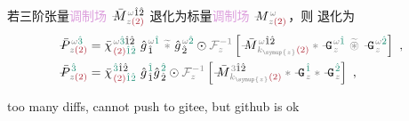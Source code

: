 若三阶张量\textcolor{Plum}{调制场} $\Xint{\mathcolor{gray}{-}}{18}{\bar{M}}^{\;\! \mathcolor{gray}{\omega} \hat{1} \hat{2} }_{\;\! \mathcolor{gray}{z} \textcolor{Maroon}{(2)} }$ 退化为标量\textcolor{Plum}{调制场} $\Xint{\mathcolor{gray}{-}}{18}{M}^{\;\! \mathcolor{gray}{\omega} }_{\;\! \mathcolor{gray}{z} \textcolor{Maroon}{(2)} }$，则  退化为
\begin{subequations} \label{eq:DP^(2)-3_12-g}
\begin{align}
	\Xint{\mathcolor{gray}{-}}{30}{\bar{P}}^{\;\! \mathcolor{gray}{\omega} \textcolor{PineGreen}{\hat{3}} }_{\;\! \mathcolor{gray}{z} \textcolor{Maroon}{(2)} } &= \bar{\chi}^{\;\! \mathcolor{gray}{\omega} \textcolor{PineGreen}{\hat{3}} \hat{1} \hat{2} }_{\;\! \textcolor{Maroon}{(2)} \textcolor{PineGreen}{\hat{1} \hat{2}}} ~ {\hat{g}}^{\;\! \mathcolor{gray}{\omega} \textcolor{PineGreen}{\hat{1}}}_{\;\! \hat{1}} ~\mathcolor{gray}{\widetilde *}~ {\hat{g}}^{\;\! \mathcolor{gray}{\omega} \textcolor{PineGreen}{\hat{2}}}_{\;\! \hat{2}} \odot \mathcolor{gray}{\mathcal F_{z}^{-1}} \left[ \Xint{\mathcolor{gray}{-}}{18}{\bar{M}}^{\;\! \mathcolor{gray}{\omega} \hat{1} \hat{2} }_{\;\! \mathcolor{gray}{k_{\symup{z}}} \textcolor{Maroon}{(2)} } \mathcolor{gray}{*} \Xint{\mathcolor{gray}{-}}{20}{\mathtt{G}}^{\;\! \mathcolor{gray}{\omega} \textcolor{PineGreen}{\hat{1}}}_{\;\! \mathcolor{gray}{z}} ~\mathcolor{gray}{\widetilde \circledast}~ \Xint{\mathcolor{gray}{-}}{20}{\mathtt{G}}^{\;\! \mathcolor{gray}{\omega} \textcolor{PineGreen}{\hat{2}}}_{\;\! \mathcolor{gray}{z}} \right] ~, \label{eq:DP^(2)-3_12-spectrum-g} \\
	\Xint{\mathcolor{gray}{-}}{30}{\bar{P}}^{\;\! \textcolor{PineGreen}{\hat{3}} }_{\;\! \mathcolor{gray}{z} \textcolor{Maroon}{(2)} } &= \bar{\chi}^{\;\! \textcolor{PineGreen}{\hat{3}} \hat{1} \hat{2} }_{\;\! \textcolor{Maroon}{(2)} \textcolor{PineGreen}{\hat{1} \hat{2}}} ~ {\hat{g}}^{\;\! \textcolor{PineGreen}{\hat{1}}}_{\;\! \hat{1}}  {\hat{g}}^{\;\! \textcolor{PineGreen}{\hat{2}}}_{\;\! \hat{2}} \odot \mathcolor{gray}{\mathcal F_{z}^{-1}} \left[ \Xint{\mathcolor{gray}{-}}{18}{\bar{M}}^{\;\! \mathcolor{gray}{3} \hat{1} \hat{2} }_{\;\! \mathcolor{gray}{k_{\symup{z}}} \textcolor{Maroon}{(2)} } \mathcolor{gray}{*} \Xint{\mathcolor{gray}{-}}{20}{\mathtt{G}}^{\;\! \textcolor{PineGreen}{\hat{1}}}_{\;\! \mathcolor{gray}{z}} \mathcolor{gray}{*} \Xint{\mathcolor{gray}{-}}{20}{\mathtt{G}}^{\;\! \textcolor{PineGreen}{\hat{2}}}_{\;\! \mathcolor{gray}{z}} \right] ~, \label{eq:DP^(2)-3_12-discrete-g}
\end{align}
\end{subequations}


\cite{dregerSecondharmonicGenerationNonlinear1990,zubairyAnalyticApproachSecondharmonic1985}

too many diffs, cannot push to gitee, but github is ok

\cite{katoSecondharmonicGeneration20481986,katoTemperaturetuned90Phasematching1994,brunerTemperaturedependentSellmeierEquation2003,jundtTemperaturedependentSellmeierEquation1997,katoSellmeierThermoopticDispersion2002}


